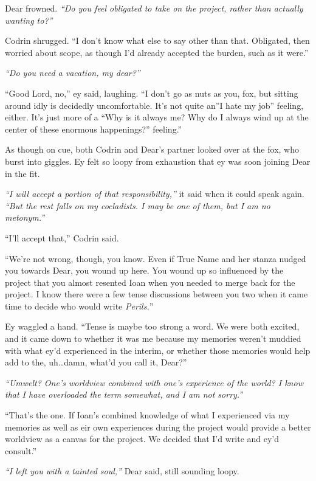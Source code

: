 Dear frowned. \emph{``Do you feel obligated to take on the project, rather than actually wanting to?''}

Codrin shrugged. ``I don't know what else to say other than that. Obligated, then worried about scope, as though I'd already accepted the burden, such as it were.''

\emph{``Do you need a vacation, my dear?''}

``Good Lord, no,'' ey said, laughing. ``I don't go as nuts as you, fox, but sitting around idly is decidedly uncomfortable. It's not quite an''I hate my job'' feeling, either. It's just more of a ``Why is it always me? Why do I always wind up at the center of these enormous happenings?'' feeling.''

As though on cue, both Codrin and Dear's partner looked over at the fox, who burst into giggles. Ey felt so loopy from exhaustion that ey was soon joining Dear in the fit.

\emph{``I will accept a portion of that responsibility,''} it said when it could speak again. \emph{``But the rest falls on my cocladists. I may be one of them, but I am no metonym.''}

``I'll accept that,'' Codrin said.

``We're not wrong, though, you know. Even if True Name and her stanza nudged you towards Dear, you wound up here. You wound up so influenced by the project that you almost resented Ioan when you needed to merge back for the project. I know there were a few tense discussions between you two when it came time to decide who would write \emph{Perils.}''

Ey waggled a hand. ``Tense is maybe too strong a word. We were both excited, and it came down to whether it was me because my memories weren't muddied with what ey'd experienced in the interim, or whether those memories would help add to the, uh\ldots damn, what'd you call it, Dear?''

\emph{``\emph{Umwelt}? One's worldview combined with one's experience of the world? I know that I have overloaded the term somewhat, and I am not sorry.''}

``That's the one. If Ioan's combined knowledge of what I experienced via my memories as well as eir own experiences during the project would provide a better worldview as a canvas for the project. We decided that I'd write and ey'd consult.''

\emph{``I left you with a tainted soul,''} Dear said, still sounding loopy.


